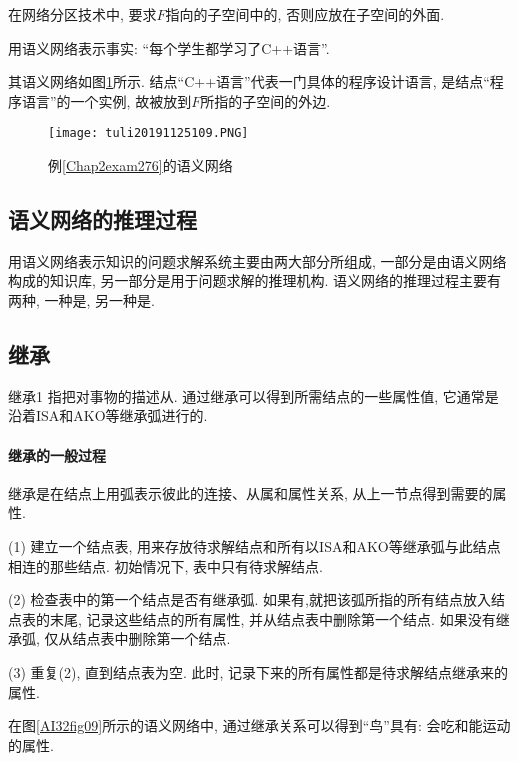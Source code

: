 \begin{remark}
    在网络分区技术中, 要求$F$指向的子空间中的, 否则应放在子空间的外面.
\end{remark}

\begin{example}\label{Chap2exam276}
用语义网络表示事实: “每个学生都学习了C++语言”.
\end{example}
其语义网络如图\ref{AI32fig109}所示. 结点“C++语言”代表一门具体的程序设计语言, 是结点“程序语言”的一个实例, 故被放到$F$所指的子空间的外边.
\begin{figure}[H]
\centering
\texttt{[image: tuli20191125109.PNG]}
\caption{例\ref{Chap2exam276}的语义网络}
\label{AI32fig109}
\end{figure}
\subsection{语义网络的推理过程}
用语义网络表示知识的问题求解系统主要由两大部分所组成, 一部分是由语义网络构成的知识库, 另一部分是用于问题求解的推理机构.
语义网络的推理过程主要有两种, 一种是, 另一种是.
\subsection{继承}
\begin{mydef}{继承}{1}
指把对事物的描述从. 通过继承可以得到所需结点的一些属性值, 它通常是沿着ISA和AKO等继承弧进行的.
\end{mydef}
\paragraph{继承的一般过程} 继承是在结点上用弧表示彼此的连接、从属和属性关系,  从上一节点得到需要的属性.

(1) 建立一个结点表, 用来存放待求解结点和所有以ISA和AKO等继承弧与此结点相连的那些结点. 初始情况下, 表中只有待求解结点.

(2) 检查表中的第一个结点是否有继承弧. 如果有,就把该弧所指的所有结点放入结点表的末尾, 记录这些结点的所有属性, 并从结点表中删除第一个结点. 如果没有继承弧, 仅从结点表中删除第一个结点.

(3) 重复(2), 直到结点表为空. 此时, 记录下来的所有属性都是待求解结点继承来的属性.
\begin{example}
    在图\ref{AI32fig09}所示的语义网络中, 通过继承关系可以得到“鸟”具有: 会吃和能运动的属性.
\end{example}
